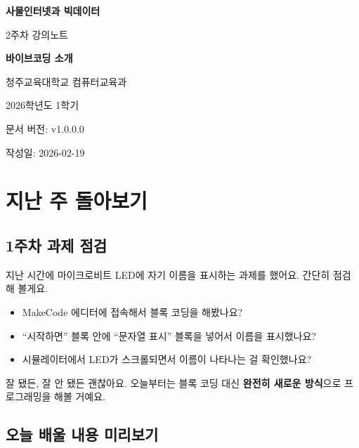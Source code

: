 \documentclass[11pt, a4paper]{article}
\begin{document}
\begin{titlepage}
\centering
\vspace*{3cm}
{\Huge\bfseries\color{mainblue} 사물인터넷과 빅데이터\par}
\vspace{0.5cm}
{\LARGE 2주차 강의노트\par}
\vspace{1.5cm}
{\Huge\bfseries 바이브코딩 소개\par}
\vspace{2cm}
{\large 청주교육대학교 컴퓨터교육과\par}
\vspace{0.3cm}
{\large 2026학년도 1학기\par}
\vspace{3cm}
{\normalsize 문서 버전: v1.0.0.0\par}
{\normalsize 작성일: 2026-02-19\par}
\end{titlepage}

\tableofcontents
\newpage

\section{지난 주 돌아보기}

\subsection{1주차 과제 점검}

지난 시간에 마이크로비트 LED에 자기 이름을 표시하는 과제를 했어요. 간단히 점검해 볼게요.

\begin{itemize}[leftmargin=1.5em]
\item MakeCode 에디터에 접속해서 블록 코딩을 해봤나요?
\item ``시작하면'' 블록 안에 ``문자열 표시'' 블록을 넣어서 이름을 표시했나요?
\item 시뮬레이터에서 LED가 스크롤되면서 이름이 나타나는 걸 확인했나요?
\end{itemize}

잘 됐든, 잘 안 됐든 괜찮아요. 오늘부터는 블록 코딩 대신 \textbf{완전히 새로운 방식}으로 프로그래밍을 해볼 거예요.

\subsection{오늘 배울 내용 미리보기}
\end{document}
